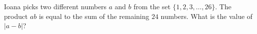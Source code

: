 Ioana picks two different numbers $a$ and $b$ from the set $\{1,2,3,\dots,26\}$. The product $ab$ is equal to the sum of the remaining $24$ numbers. What is the value of $|a-b|$?
